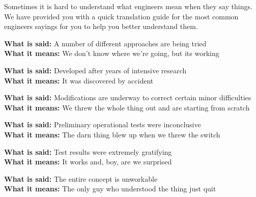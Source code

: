 \documentclass[9pt]{extarticle} %
\begin{document}
\begin{minipage}[t]{.61\linewidth}

\hypertarget{secondnews}{} 

Sometimes it is hard to understand what engineers mean when they say things. We have provided you with a quick translation guide for the most common engineers sayings for you to help you better understand them.

\textbf{What is said:} A number of different approaches are being tried \\
\textbf{What it means:} We don't know where we're going, but its working 

\textbf{What is said:} Developed after years of intensive research \\
\textbf{What it means:}	It was discovered by accident

\textbf{What is said:} Modifications are underway to correct certain minor difficulties \\
\textbf{What it means:} We threw the whole thing out and are starting from scratch

\textbf{What is said:} Preliminary operational tests were inconclusive \\
\textbf{What it means:} The darn thing blew up when we threw the switch

\textbf{What is said:} Test results were extremely gratifying \\
\textbf{What it means:} It works and, boy, are we surprised

\textbf{What is said:} The entire concept is unworkable \\
\textbf{What it means:} The only guy who understood the thing just quit


\end{minipage} %
\end{document}
